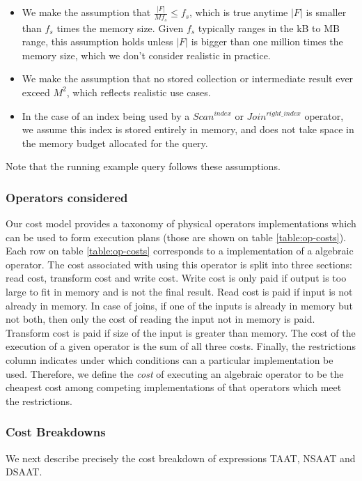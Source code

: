 \begin{itemize}
\item We make the assumption that $\frac{|F|}{M f_s} \leqslant f_s$, which is true anytime $|F|$ is smaller than $f_s$ times the memory size. Given $f_s$ typically ranges in the kB to MB range, this assumption holds unless $|F|$ is bigger than one million times the memory size, which we don't consider realistic in practice.
\item We make the assumption that no stored collection or intermediate result ever exceed $M^2$, which reflects realistic use cases.
\item In the case of an index being used by a $Scan^{index}$ or $Join^{right\_index}$ operator, we assume this index is stored entirely in memory, and does not take space in the memory budget allocated for the query.
\end{itemize}

Note that the running example query follows these assumptions.

\subsubsection{Operators considered}

Our cost model provides a taxonomy of physical operators implementations which can be used to form execution plans (those are shown on table \ref{table:op-costs}). Each row on table \ref{table:op-costs} corresponds to a implementation of a algebraic operator. The cost associated with using this operator is split into three sections: read cost, transform cost and write cost. Write cost is only paid if output is too large to fit in memory and is not the final result. Read cost is paid if input is not already in memory. In case of joins, if one of the inputs is already in memory but not both, then only the cost of reading the input not in memory is paid. Transform cost is paid if size of the input is greater than memory. The cost of the execution of a given operator is the sum of all three costs. Finally, the restrictions column indicates under which conditions can a particular implementation be used. Therefore, we define the \emph{cost} of executing an algebraic operator to be the cheapest cost among competing implementations of that operators which meet the restrictions. 

\subsubsection{Cost Breakdowns}

We next describe precisely the cost breakdown of expressions TAAT, NSAAT and DSAAT. 

